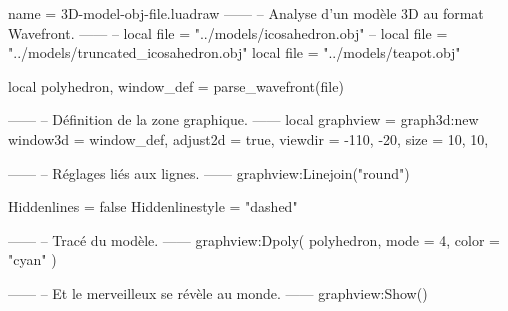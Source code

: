 \documentclass{standalone}
\begin{document}
\begin{luadraw}{name = 3D-model-obj-file.luadraw}
------
-- Analyse d'un modèle 3D au format Wavefront.
------
-- local file = "../models/icosahedron.obj"
-- local file = "../models/truncated_icosahedron.obj"
local file = "../models/teapot.obj"

local polyhedron, window_def = parse_wavefront(file)

------
-- Définition de la zone graphique.
------
local graphview = graph3d:new{
  window3d = window_def,
  adjust2d = true,
  viewdir  = {-110, -20},
  size     = {10, 10},
}

------
-- Réglages liés aux lignes.
------
graphview:Linejoin("round")

Hiddenlines     = false
Hiddenlinestyle = "dashed"

------
-- Tracé du modèle.
------
graphview:Dpoly(
  polyhedron,
  {
    mode  = 4,
    color = "cyan"
  })

------
-- Et le merveilleux se révèle au monde.
------
graphview:Show()
\end{luadraw}
\end{document}
